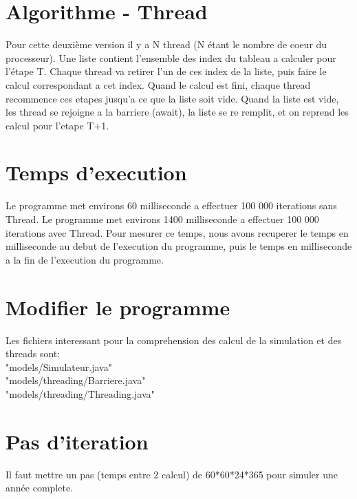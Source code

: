 \documentclass[11pt,a4paper]{article}
\begin{document}
\section{Algorithme - Thread}
Pour cette deuxième version il y a N thread (N étant le nombre de coeur du processeur).
Une liste contient l'ensemble des index du tableau a calculer pour l'étape T. 
Chaque thread va retirer l'un de ces index de la liste, puis faire le calcul correspondant a cet index. 
Quand le calcul est fini, chaque thread recommence ces etapes jusqu'a ce que la liste soit vide. 
Quand la liste est vide, les thread se rejoigne a la barriere (await), la liste se re remplit, et on reprend les calcul pour l'etape T+1.

\section{Temps d'execution}
Le programme met environs 60 milliseconde a effectuer 100 000 iterations sans Thread.
Le programme met environs 1400 milliseconde a effectuer 100 000 iterations avec Thread.
Pour mesurer ce temps, nous avons recuperer le temps en milliseconde au debut de l'execution du programme, 
puis le temps en milliseconde a la fin de l'execution du programme.

\section{Modifier le programme}
Les fichiers interessant pour la comprehension des calcul de la simulation et des threads sont: \\
"models/Simulateur.java"\\
"models/threading/Barriere.java"\\
"models/threading/Threading.java"\\

\section{Pas d'iteration}
Il faut mettre un pas (temps entre 2 calcul) de 60*60*24*365 pour simuler une année complete.\\
\end{document}
